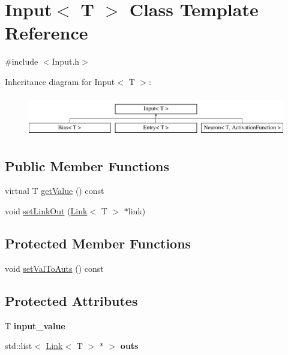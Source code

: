 \hypertarget{class_input}{\section{\-Input$<$ \-T $>$ \-Class \-Template \-Reference}
\label{class_input}
}


{\ttfamily \#include $<$\-Input.\-h$>$}

\-Inheritance diagram for \-Input$<$ \-T $>$\-:\begin{figure}[H]
\begin{center}
\leavevmode
\includegraphics[height=1.803543cm]{class_input}
\end{center}
\end{figure}
\subsection*{\-Public \-Member \-Functions}
\begin{DoxyCompactItemize}
\item 
virtual \-T \hyperlink{class_input_acd4a6ffcb32722a8f7dddf37b9ed0a66}{get\-Value} () const 
\item 
void \hyperlink{class_input_a74abbc00098fc83a0d6b1c67f4590464}{set\-Link\-Out} (\hyperlink{class_link}{\-Link}$<$ \-T $>$ $\ast$link)
\end{DoxyCompactItemize}
\subsection*{\-Protected \-Member \-Functions}
\begin{DoxyCompactItemize}
\item 
void \hyperlink{class_input_afa18c71eae21a7233fd6865e44c25df0}{set\-Val\-To\-Auts} () const 
\end{DoxyCompactItemize}
\subsection*{\-Protected \-Attributes}
\begin{DoxyCompactItemize}
\item 
\hypertarget{class_input_aa2eb098d4f45d4ff4fcd2206fab7f3e5}{\-T {\bfseries input\-\_\-value}}\label{class_input_aa2eb098d4f45d4ff4fcd2206fab7f3e5}

\item 
\hypertarget{class_input_add27905b0d403f8908cf2bf7a95b740f}{std\-::list$<$ \hyperlink{class_link}{\-Link}$<$ \-T $>$ $\ast$ $>$ {\bfseries outs}}\label{class_input_add27905b0d403f8908cf2bf7a95b740f}

\end{DoxyCompactItemize}


